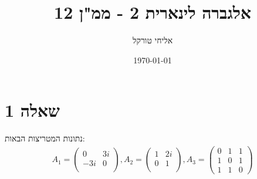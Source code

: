 \documentclass{article}
\title{אלגברה לינארית 2 - ממ"ן 12}
\author{אליחי טורקל \ID}
\date\today
\begin{document}
	\maketitle %

	\section*{שאלה 1}
	נתונות המטריצות הבאות:
	\begin{align*}
		A_1 = \begin{pmatrix}
			0 & 3i \\
			-3i & 0 \\
		\end{pmatrix},
		A_2 = \begin{pmatrix}
			1 & 2i \\
			0 & 1 \\
		\end{pmatrix},
		A_3 = \begin{pmatrix}
			0 & 1 & 1 \\
			1 & 0 & 1 \\
			1 & 1 & 0
		\end{pmatrix}
	\end{align*}
\end{document}
